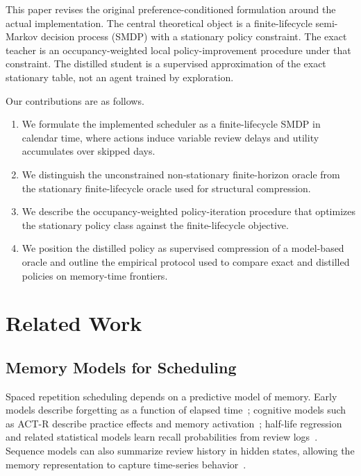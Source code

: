\documentclass[11pt]{article}
\begin{document}
This paper revises the original preference-conditioned formulation around the actual implementation. The central theoretical object is a finite-lifecycle semi-Markov decision process (SMDP) with a stationary policy constraint. The exact teacher is an occupancy-weighted local policy-improvement procedure under that constraint. The distilled student is a supervised approximation of the exact stationary table, not an agent trained by exploration.

Our contributions are as follows.
\begin{enumerate}
    \item We formulate the implemented scheduler as a finite-lifecycle SMDP in calendar time, where actions induce variable review delays and utility accumulates over skipped days.
    \item We distinguish the unconstrained non-stationary finite-horizon oracle from the stationary finite-lifecycle oracle used for structural compression.
    \item We describe the occupancy-weighted policy-iteration procedure that optimizes the stationary policy class against the finite-lifecycle objective.
    \item We position the distilled policy as supervised compression of a model-based oracle and outline the empirical protocol used to compare exact and distilled policies on memory-time frontiers.
\end{enumerate}

\section{Related Work}

\subsection{Memory Models for Scheduling}

Spaced repetition scheduling depends on a predictive model of memory. Early models describe forgetting as a function of elapsed time~\citep{ebbinghaus1913memory}; cognitive models such as ACT-R describe practice effects and memory activation~\citep{anderson1998atomic}; half-life regression and related statistical models learn recall probabilities from review logs~\citep{pavlik2008using,settles2016trainable}. Sequence models can also summarize review history in hidden states, allowing the memory representation to capture time-series behavior~\citep{cho2014learning,su2023optimizing}.
\end{document}
